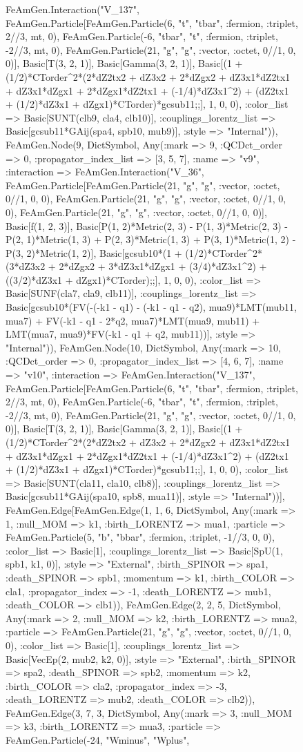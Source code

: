 \documentclass{revtex4}
\begin{document}
\begin{figure}[!htb]
\begin{center}
{FeAmGen.Interaction("V_137", FeAmGen.Particle[FeAmGen.Particle(6, "t", "tbar", :fermion, :triplet, 2//3, mt, 0), FeAmGen.Particle(-6, "tbar", "t", :fermion, :triplet, -2//3, mt, 0), FeAmGen.Particle(21, "g", "g", :vector, :octet, 0//1, 0, 0)], Basic[T(3, 2, 1)], Basic[Gamma(3, 2, 1)], Basic[(1 + (1/2)*CTorder^2*(2*dZ2tx2 + dZ3x2 + 2*dZgx2 + dZ3x1*dZ2tx1 + dZ3x1*dZgx1 + 2*dZgx1*dZ2tx1 + (-1/4)*dZ3x1^2) + (dZ2tx1 + (1/2)*dZ3x1 + dZgx1)*CTorder)*gcsub11;;], 1, 0, 0), :color_list => Basic[SUNT(clb9, cla4, clb10)], :couplings_lorentz_list => Basic[gcsub11*GAij(spa4, spb10, mub9)], :style => "Internal")), FeAmGen.Node(9, Dict{Symbol, Any}(:mark => 9, :QCDct_order => 0, :propagator_index_list => [3, 5, 7], :name => "v9", :interaction => FeAmGen.Interaction("V_36", FeAmGen.Particle[FeAmGen.Particle(21, "g", "g", :vector, :octet, 0//1, 0, 0), FeAmGen.Particle(21, "g", "g", :vector, :octet, 0//1, 0, 0), FeAmGen.Particle(21, "g", "g", :vector, :octet, 0//1, 0, 0)], Basic[f(1, 2, 3)], Basic[P(1, 2)*Metric(2, 3) - P(1, 3)*Metric(2, 3) - P(2, 1)*Metric(1, 3) + P(2, 3)*Metric(1, 3) + P(3, 1)*Metric(1, 2) - P(3, 2)*Metric(1, 2)], Basic[gcsub10*(1 + (1/2)*CTorder^2*(3*dZ3x2 + 2*dZgx2 + 3*dZ3x1*dZgx1 + (3/4)*dZ3x1^2) + ((3/2)*dZ3x1 + dZgx1)*CTorder);;], 1, 0, 0), :color_list => Basic[SUNF(cla7, cla9, clb11)], :couplings_lorentz_list => Basic[gcsub10*(FV(-(-k1 - q1) - (-k1 - q1 - q2), mua9)*LMT(mub11, mua7) + FV(-k1 - q1 - 2*q2, mua7)*LMT(mua9, mub11) + LMT(mua7, mua9)*FV(-k1 - q1 + q2, mub11))], :style => "Internal")), FeAmGen.Node(10, Dict{Symbol, Any}(:mark => 10, :QCDct_order => 0, :propagator_index_list => [4, 6, 7], :name => "v10", :interaction => FeAmGen.Interaction("V_137", FeAmGen.Particle[FeAmGen.Particle(6, "t", "tbar", :fermion, :triplet, 2//3, mt, 0), FeAmGen.Particle(-6, "tbar", "t", :fermion, :triplet, -2//3, mt, 0), FeAmGen.Particle(21, "g", "g", :vector, :octet, 0//1, 0, 0)], Basic[T(3, 2, 1)], Basic[Gamma(3, 2, 1)], Basic[(1 + (1/2)*CTorder^2*(2*dZ2tx2 + dZ3x2 + 2*dZgx2 + dZ3x1*dZ2tx1 + dZ3x1*dZgx1 + 2*dZgx1*dZ2tx1 + (-1/4)*dZ3x1^2) + (dZ2tx1 + (1/2)*dZ3x1 + dZgx1)*CTorder)*gcsub11;;], 1, 0, 0), :color_list => Basic[SUNT(cla11, cla10, clb8)], :couplings_lorentz_list => Basic[gcsub11*GAij(spa10, spb8, mua11)], :style => "Internal"))], FeAmGen.Edge[FeAmGen.Edge(1, 1, 6, Dict{Symbol, Any}(:mark => 1, :null_MOM => k1, :birth_LORENTZ => mua1, :particle => FeAmGen.Particle(5, "b", "bbar", :fermion, :triplet, -1//3, 0, 0), :color_list => Basic[1], :couplings_lorentz_list => Basic[SpU(1, spb1, k1, 0)], :style => "External", :birth_SPINOR => spa1, :death_SPINOR => spb1, :momentum => k1, :birth_COLOR => cla1, :propagator_index => -1, :death_LORENTZ => mub1, :death_COLOR => clb1)), FeAmGen.Edge(2, 2, 5, Dict{Symbol, Any}(:mark => 2, :null_MOM => k2, :birth_LORENTZ => mua2, :particle => FeAmGen.Particle(21, "g", "g", :vector, :octet, 0//1, 0, 0), :color_list => Basic[1], :couplings_lorentz_list => Basic[VecEp(2, mub2, k2, 0)], :style => "External", :birth_SPINOR => spa2, :death_SPINOR => spb2, :momentum => k2, :birth_COLOR => cla2, :propagator_index => -3, :death_LORENTZ => mub2, :death_COLOR => clb2)), FeAmGen.Edge(3, 7, 3, Dict{Symbol, Any}(:mark => 3, :null_MOM => k3, :birth_LORENTZ => mua3, :particle => FeAmGen.Particle(-24, "Wminus", "Wplus", }
\end{center}
\end{figure}
\end{document}
